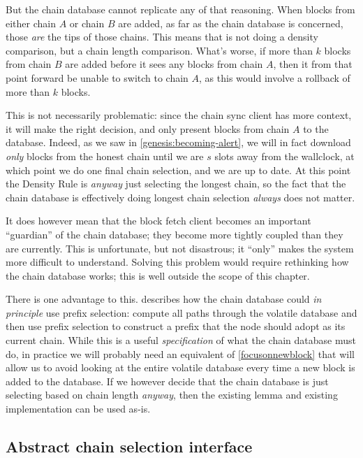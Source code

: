 \pagebreak

But the chain database cannot replicate any of that reasoning. When blocks  from
either chain $A$ or chain $B$ are added, as far as the chain database is
concerned, those \emph{are} the tips of those chains. This means that is not
doing a density comparison, but a chain length comparison. What's worse, if more
than $k$ blocks from chain $B$ are added before it sees any blocks from chain
$A$, then it from that point forward be unable to switch to chain $A$, as this
would involve a rollback of more than $k$ blocks.

This is not necessarily problematic: since the chain sync client has more
context, it will make the right decision, and only present blocks from chain $A$
to the database. Indeed, as we saw in \cref{genesis:becoming-alert}, we will
in fact download \emph{only} blocks from the honest chain until we are $s$
slots away from the wallclock, at which point we do one final chain selection,
and we are up to date. At this point the Density Rule is \emph{anyway} just
selecting the longest chain, so the fact that the chain database is effectively
doing longest chain selection \emph{always} does not matter.

It does however mean that the block fetch client becomes an important
``guardian'' of the chain database; they become more tightly coupled than they
are currently. This is unfortunate, but not disastrous; it ``only'' makes the
system more difficult to understand. Solving this problem would require
rethinking how the chain database works; this is well outside the scope of this
chapter.

There is one advantage to this.   describes how
the chain database could \emph{in principle} use prefix selection: compute all
paths through the volatile database and then use prefix selection to construct a
prefix that the node should adopt as its current chain. While this is a useful
\emph{specification} of what the chain database must do, in practice we will
probably need an equivalent of \cref{focusonnewblock} that will allow us to
avoid looking at the entire volatile database every time a new block is added to
the database. If we however decide that the chain database is just selecting
based on chain length \emph{anyway}, then the existing lemma and existing
implementation can be used as-is.


\subsection{Abstract chain selection interface}


